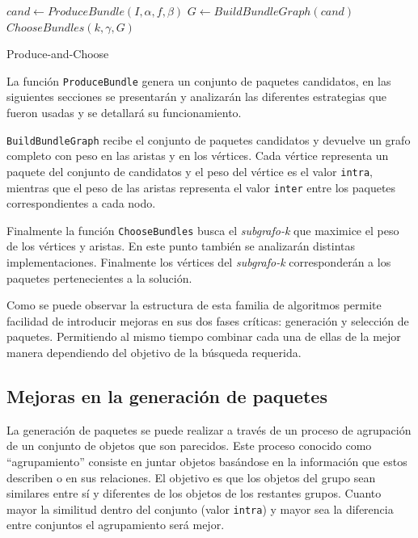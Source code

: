 \begin{center}
	\begin{algorithm}[H]
	\DontPrintSemicolon
	\SetAlgoLined
		$cand \leftarrow ProduceBundle(I,\alpha,f,\beta)$\;
		$G \leftarrow BuildBundleGraph(cand)$\;
		\Return $ChooseBundles(k,\gamma,G)$\;
	\caption{Produce-and-Choose}\label{alg:PAC}
	\end{algorithm}
\end{center}

La función \texttt{ProduceBundle} genera un conjunto de paquetes candidatos, en las siguientes secciones se presentarán y analizarán las diferentes estrategias que fueron usadas y se detallará su funcionamiento.

\texttt{BuildBundleGraph} recibe el conjunto de paquetes candidatos y devuelve un grafo completo con peso en las aristas y en los vértices. Cada vértice representa un paquete del conjunto de candidatos y el peso del vértice es el valor \texttt{intra}, mientras que el peso de las aristas representa el valor \texttt{inter} entre los paquetes correspondientes a cada nodo. 

Finalmente la función \texttt{ChooseBundles} busca el \textit{subgrafo-k} que maximice el peso de los vértices y aristas. En este punto también se analizarán distintas implementaciones. Finalmente los vértices del \textit{subgrafo-k} corresponderán a los paquetes pertenecientes a la solución.

Como se puede observar la estructura de esta familia de algoritmos permite facilidad de introducir mejoras en sus dos fases críticas: generación y selección de paquetes. Permitiendo al mismo tiempo combinar cada una de ellas de la mejor manera dependiendo del objetivo de la búsqueda requerida.

\subsection{Mejoras en la generación de paquetes}
La generación de paquetes se puede realizar a través de un proceso de agrupación de un conjunto de objetos que son parecidos. Este proceso conocido como ``agrupamiento'' consiste en juntar objetos basándose en la información que estos describen o en sus relaciones. El objetivo es que los objetos del grupo sean similares entre sí y diferentes de los objetos de los restantes grupos. Cuanto mayor la similitud dentro del conjunto (valor \texttt{intra}) y mayor sea la diferencia entre conjuntos el agrupamiento será mejor.

